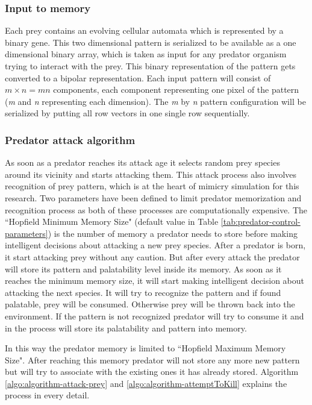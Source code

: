 \subsubsection{Input to memory}
Each prey contains an evolving cellular automata which is represented by a binary gene. This two dimensional pattern is serialized to be available as a one dimensional binary array, which is taken as input for any predator organism trying to interact with the prey. This binary representation of the pattern gets converted to a bipolar representation. Each input pattern will consist of \(\textit{m} \times \textit{n} = \textit{mn}\) components, each component representing one pixel of the pattern (\textit{m} and \textit{n} representing each dimension). The \textit{m} by \textit{n} pattern configuration will be serialized by putting all row vectors in one single row sequentially.

\subsubsection{Predator attack algorithm}
As soon as a predator reaches its attack age it selects random prey species around its vicinity and starts attacking them. This attack process also involves recognition of prey pattern, which is at the heart of mimicry simulation for this research. Two parameters have been defined to limit predator memorization and recognition process as both of these processes are computationally expensive. The ``Hopfield Minimum Memory Size" (default value in Table \ref{tab:predator-control-parameters}) is the number of memory a predator needs to store before making intelligent decisions about attacking a new prey species. After a predator is born, it start attacking prey without any caution. But after every attack the predator will store its pattern and palatability level inside its memory. As soon as it reaches the minimum memory size, it will start making intelligent decision about attacking the next species. It will try to recognize the pattern and if found palatable, prey will be consumed. Otherwise prey will be thrown back into the environment. If the pattern is not recognized predator will try to consume it and in the process will store its palatability and pattern into memory. 

In this way the predator memory is limited to ``Hopfield Maximum Memory Size". After reaching this memory predator will not store any more new pattern but will try to associate with the existing ones it has already stored. Algorithm \ref{algo:algorithm-attack-prey} and \ref{algo:algorithm-attemptToKill} explains the process in every detail.


